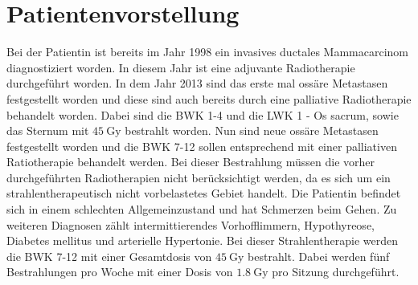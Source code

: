 \section{Patientenvorstellung}

Bei der Patientin ist bereits im Jahr 1998 ein invasives ductales Mammacarcinom
diagnostiziert worden. In diesem Jahr ist eine adjuvante Radiotherapie
durchgeführt worden. In dem Jahr 2013 sind das erste mal ossäre Metastasen festgestellt worden
und diese sind auch bereits durch eine palliative Radiotherapie behandelt worden. Dabei sind
die BWK 1-4 und die LWK 1 - Os sacrum, sowie das Sternum mit $\SI{45}{\gray}$ bestrahlt worden.
Nun sind neue ossäre Metastasen festgestellt worden und die BWK 7-12 sollen entsprechend
mit einer palliativen Ratiotherapie behandelt werden. Bei dieser Bestrahlung müssen die
vorher durchgeführten Radiotherapien nicht berücksichtigt werden, da es sich um ein strahlentherapeutisch
nicht vorbelastetes Gebiet handelt.
Die Patientin befindet sich in einem schlechten Allgemeinzustand und hat Schmerzen beim Gehen.
Zu weiteren Diagnosen zählt intermittierendes Vorhofflimmern, Hypothyreose, Diabetes mellitus und
arterielle Hypertonie. Bei dieser Strahlentherapie werden die BWK 7-12 mit einer Gesamtdosis von
$\SI{45}{\gray}$ bestrahlt. Dabei werden fünf Bestrahlungen pro Woche mit einer Dosis von
$\SI{1.8}{\gray}$ pro Sitzung durchgeführt.
